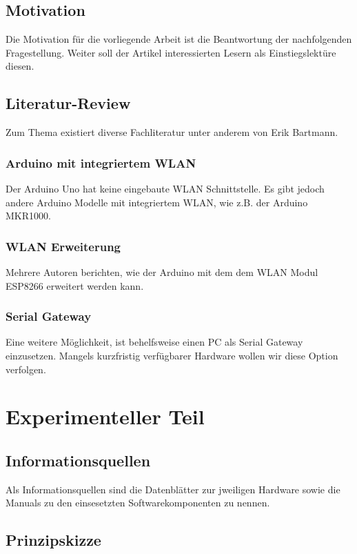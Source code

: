 \subsection{Motivation}
Die Motivation für die vorliegende Arbeit ist die Beantwortung der nachfolgenden Fragestellung.
Weiter soll der Artikel interessierten Lesern als Einstiegslektüre diesen.

\subsection{Literatur-Review}
Zum Thema existiert diverse Fachliteratur unter anderem von Erik Bartmann\cite{bartmannArduino}\cite{bartmannESP8266}\cite{bartmannESP32}.

\subsubsection{Arduino mit integriertem WLAN}
Der Arduino Uno hat keine eingebaute WLAN Schnittstelle. Es gibt jedoch andere Arduino Modelle mit integriertem WLAN, wie z.B. der Arduino MKR1000.

\subsubsection{WLAN Erweiterung}
Mehrere Autoren berichten\cite{temperatureDashboard}\cite{websocketcommunication}, wie der Arduino mit dem dem WLAN Modul ESP8266 erweitert werden kann. 

\subsubsection{Serial Gateway}
Eine weitere Möglichkeit, ist behelfsweise einen PC als Serial Gateway einzusetzen.
Mangels kurzfristig verfügbarer Hardware wollen wir diese Option verfolgen.

\section{Experimenteller Teil}

\subsection{Informationsquellen}
Als Informationsquellen sind die Datenblätter zur jweiligen Hardware sowie die Manuals zu den einsesetzten Softwarekomponenten zu nennen.

\subsection{Prinzipskizze}

